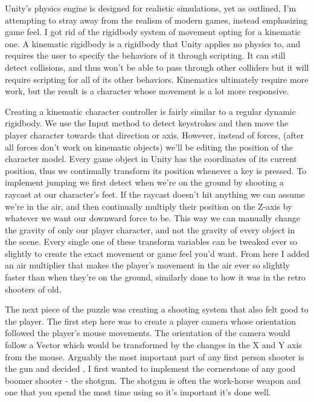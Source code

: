 \documentclass[10pt,twocolumn]{article}
\begin{document}
Unity’s physics engine is designed for realistic simulations, yet as outlined, I’m attempting to stray away from the realism of modern games, instead emphasizing game feel. I got rid of the rigidbody system of movement opting for a kinematic one. A kinematic rigidbody is a rigidbody that Unity applies no physics to, and requires the user to specify the behaviors of it through scripting. It can still detect collisions, and thus won’t be able to pass through other colliders but it will require scripting for all of its other behaviors. Kinematics ultimately require more work, but the result is a character whose movement is a lot more responsive.

Creating a kinematic character controller is fairly similar to a regular dynamic rigidbody. We use the Input method to detect keystrokes and then move the player character towards that direction or axis. However, instead of forces, (after all forces don’t work on kinematic objects) we’ll be editing the position of the character model. Every game object in Unity has the coordinates of its current position, thus we continually transform its position whenever a key is pressed. To implement jumping we first detect when we’re on the ground by shooting a raycast at our character’s feet. If the raycast doesn’t hit anything we can assume we’re in the air, and then continually multiply their position on the Z-axis by whatever we want our downward force to be. This way we can manually change the gravity of only our player character, and not the gravity of every object in the scene. Every single one of these transform variables can be tweaked ever so slightly to create the exact movement or game feel you’d want. From here I added an air multiplier that makes the player’s movement in the air ever so slightly faster than when they’re on the ground, similarly done to how it was in the retro shooters of old.

The next piece of the puzzle was creating a shooting system that also felt good to the player. The first step here was to create a player camera whose orientation followed the player’s mouse movements. The orientation of the camera would follow a Vector which would be transformed by the changes in the X and Y axis from the mouse. Arguably the most important part of any first person shooter is the gun and decided , I first wanted to implement the cornerstone of any good boomer shooter - the shotgun. The shotgun is often the work-horse weapon and one that you spend the most time using so it's important it's done well.
\end{document}
